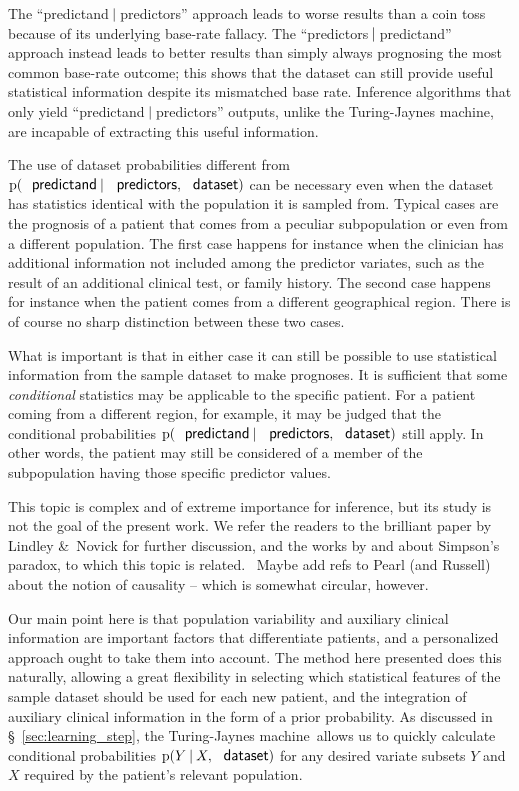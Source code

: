 \documentclass[utf8]{FrontiersinHarvard} %
\newcommand*{\puzzle}{{\fontencoding{U}\fontfamily{fontawesometwo}\selectfont\symbol{225}}}
\newcommand{\mynotez}[1]{{\color{notecolour}\puzzle\ #1}}
\newcommand*{\amp}{\&}
\newcommand*{\sect}{\S}%
\newcommand*{\p}{\mathrm{p}}%
\renewcommand*{\|}[1][]{\nonscript\:#1\vert\nonscript\:\mathopen{}}
\newcommand*{\tjm}{Turing-Jaynes machine}
\begin{document}
\medskip
  
The \enquote{predictand$\|$predictors} approach leads to worse results than a coin toss because of its underlying base-rate fallacy. The \enquote{predictors$\|$predictand} approach instead leads to better results than simply always prognosing the most common base-rate outcome; this shows that the dataset can still provide useful statistical information despite its mismatched base rate. Inference algorithms that only yield \enquote{predictand$\|$predictors} outputs, unlike the \tjm, are incapable of extracting this useful information.

\medskip

The use of dataset probabilities different from $\p(\textsf{\small predictand} \| \textsf{\small predictors}, \textsf{\small dataset})$ can be necessary even when the dataset has statistics identical with the population it is sampled from. Typical cases are the prognosis of a patient that comes from a peculiar subpopulation or even from a different population. The first case happens for instance when the clinician has additional information not included among the predictor variates, such as the result of an additional clinical test, or family history. The second case happens for instance when the patient comes from a different geographical region. There is of course no sharp distinction between these two cases.

What is important is that in either case it can still be possible to use statistical information from the sample dataset to make prognoses. It is sufficient that some \emph{conditional} statistics may be applicable to the specific patient. For a patient coming from a different region, for example, it may be judged that the conditional probabilities $\p(\textsf{\small predictand} \| \textsf{\small predictors}, \textsf{\small dataset})$ still apply. In other words, the patient may still be considered of a member of the subpopulation having those specific predictor values.

This topic is complex and of extreme importance for inference, but its study is not the goal of the present work. We refer the readers to the brilliant paper by Lindley \amp\ Novick \citeyearpar{lindleyetal1981} for further discussion, and the works by \cite{malinasetal2004_r2016} and \cite{sprengeretal2021} about Simpson's paradox, to which this topic is related. \mynotez{Maybe add refs to Pearl (and Russell) about the notion of causality -- which is somewhat circular, however.}

Our main point here is that population variability and auxiliary clinical information are important factors that differentiate patients, and a personalized approach ought to take them into account. The method here presented does this naturally, allowing a great flexibility in selecting which statistical features of the sample dataset should be used for each new patient, and the integration of auxiliary clinical information in the form of a prior probability. As discussed in \sect~\ref{sec:learning_step}, the \tjm\ allows us to quickly calculate conditional probabilities $\p(Y\|X, \textsf{\small dataset})$ for any desired variate subsets $Y$ and $X$ required by the patient's relevant population.
\end{document}
